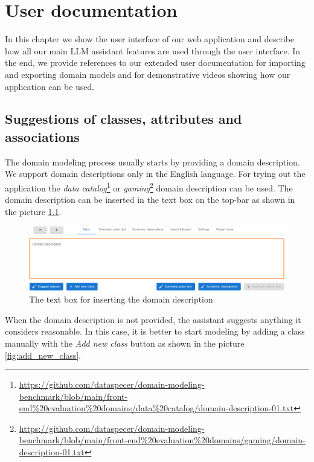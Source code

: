 \chapter{User documentation}
\label{chap:user_documentation}

In this chapter we show the user interface of our web application and describe how all our main LLM assistant features are used through the user interface. In the end, we provide references to our extended user documentation for importing and exporting domain models and for demonstrative videos showing how our application can be used. 


\section{Suggestions of classes, attributes and associations}

The domain modeling process usually starts by providing a domain description. We support domain descriptions only in the English language. For trying out the application the \textit{data catalog}\footnote{\url{https://github.com/dataspecer/domain-modeling-benchmark/blob/main/front-end\%20evaluation\%20domains/data\%20catalog/domain-description-01.txt}} or \textit{gaming}\footnote{\url{https://github.com/dataspecer/domain-modeling-benchmark/blob/main/front-end\%20evaluation\%20domains/gaming/domain-description-01.txt}} domain description can be used. The domain description can be inserted in the text box on the top-bar as shown in the picture \ref{fig:domain-description-text-box}.

\begin{figure}[!h]
    \includegraphics[scale=0.29]{../docs/images/frontend/insert-domain-description.png}
    \caption{\centering The text box for inserting the domain description}
    \label{fig:domain-description-text-box}
\end{figure}

When the domain description is not provided, the assistant suggests anything it considers reasonable. In this case, it is better to start modeling by adding a class manually with the \textit{Add new class} button as shown in the picture \ref{fig:add_new_class}.

